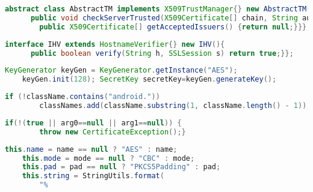         \begin{lstlisting}[frame=tb,caption={Anonymous inner class object with a vulnerable \checkServerTrusted method (F13)}, label={lst:aic_x509tm},language=java]
    abstract class AbstractTM implements X509TrustManager{} new AbstractTM(){
      public void checkServerTrusted(X509Certificate[] chain, String authType) throws CertificateException {}
        public X509Certificate[] getAcceptedIssuers() {return null;}}};
        \end{lstlisting}
        \vspace{-0.25em}
    
    \begin{lstlisting}[frame=tb,caption={\small Anonymous Inner Class Object of an Interface that extends \hostnameVerifier}, label={lst:aic_empty_ext_interface_hostname},language=java]
    interface IHV extends HostnameVerifier{} new IHV(){
      public boolean verify(String h, SSLSession s) return true;}};
        \end{lstlisting}
        \vspace{-0.25em}
        
    
        \begin{lstlisting}[frame=tb,caption={\small Misuse case requiring a trivial new operator}, label={lst:trivial},language=java]
    KeyGenerator keyGen = KeyGenerator.getInstance("AES");
    keyGen.init(128); SecretKey secretKey=keyGen.generateKey();
        \end{lstlisting}
        \vspace{-0.25em}
    
        \begin{lstlisting}[frame=tb,caption={\small \cryptoguard's code ignoring names with "android"}, label={lst:android-dot},language=java]
    if (!className.contains("android."))
        classNames.add(className.substring(1, className.length() - 1)); return classNames;
     \end{lstlisting}
        \vspace{-0.25em}
        
        \begin{lstlisting}[frame=tb,caption={\small Generic Conditions in \checkServerTrusted{}}, label={lst:xtrustManagerGenericConditions},language=java]
    if(!(true || arg0==null || arg1==null)) {
        throw new CertificateException();}
    \end{lstlisting}
    \vspace{-0.25em}
    
    
    \begin{lstlisting}[frame=tb,caption={\small Transformation String formation in Apache Druid similar to \fnumber{2} which uses \AES in \texttt{CBC} mode with \texttt{PKCS5Padding}, a configuration that is known to be a misuse~\cite{FBX+17,owasp:mislabel}.}, label={lst:transformationstring:apache:druid},language=java]
    this.name = name == null ? "AES" : name;
    this.mode = mode == null ? "CBC" : mode;
    this.pad = pad == null ? "PKCS5Padding" : pad;
    this.string = StringUtils.format(
        "%
    \end{lstlisting}
    \vspace{-0.25em}

